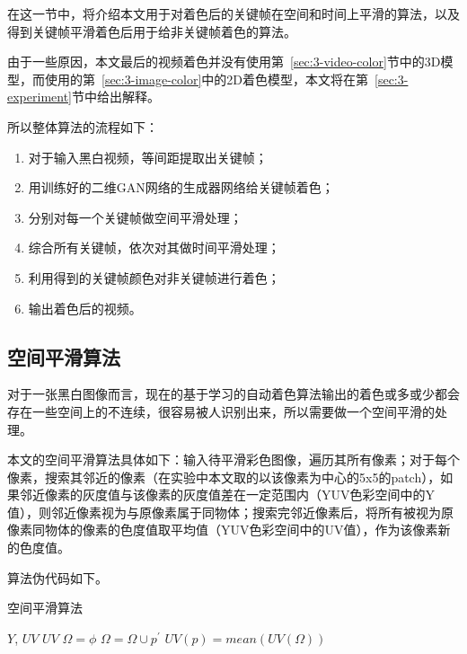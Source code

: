   在这一节中，将介绍本文用于对着色后的关键帧在空间和时间上平滑的算法，以及得到关键帧平滑着色后用于给非关键帧着色的算法。

  由于一些原因，本文最后的视频着色并没有使用第~\ref{sec:3-video-color}节中的3D模型，而使用的第~\ref{sec:3-image-color}中的2D着色模型，本文将在第~\ref{sec:3-experiment}节中给出解释。

  所以整体算法的流程如下：

  \begin{enumerate}
    \item 对于输入黑白视频，等间距提取出关键帧；
    \item 用训练好的二维GAN网络的生成器网络给关键帧着色；
    \item 分别对每一个关键帧做空间平滑处理；
    \item 综合所有关键帧，依次对其做时间平滑处理；
    \item 利用得到的关键帧颜色对非关键帧进行着色；
    \item 输出着色后的视频。
  \end{enumerate}

\subsection{空间平滑算法}
\label{sec:3-spatial-smooth}

  对于一张黑白图像而言，现在的基于学习的自动着色算法输出的着色或多或少都会存在一些空间上的不连续，很容易被人识别出来，所以需要做一个空间平滑的处理。

  本文的空间平滑算法具体如下：输入待平滑彩色图像，遍历其所有像素；对于每个像素，搜索其邻近的像素（在实验中本文取的以该像素为中心的5x5的patch），如果邻近像素的灰度值与该像素的灰度值差在一定范围内（YUV色彩空间中的Y值），则邻近像素视为与原像素属于同物体；搜索完邻近像素后，将所有被视为原像素同物体的像素的色度值取平均值（YUV色彩空间中的UV值），作为该像素新的色度值。

  算法伪代码如下。

  \begin{algorithm}[H]
  \label{algo:5-spatial-smooth}
    \caption*{空间平滑算法}
    \begin{algorithmic}[1]
      \Require $Y$, $UV$
      \Ensure  $UV$
          \State $\Omega = \phi$
              \State $\Omega = \Omega \cup p^{'}$
            \EndIf
          \EndFor
          \State $UV(p) = mean(UV(\Omega))$
        \EndFor
      \EndFunction
    \end{algorithmic}
  \end{algorithm}


